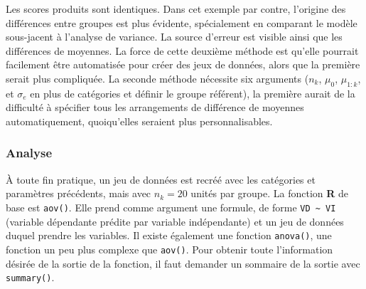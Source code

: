 \documentclass[
]{book}
\begin{document}
Les scores produits sont identiques. Dans cet exemple par contre, l'origine des différences entre groupes est plus évidente, spécialement en comparant le modèle sous-jacent à l'analyse de variance. La source d'erreur est visible ainsi que les différences de moyennes. La force de cette deuxième méthode est qu'elle pourrait facilement être automatisée pour créer des jeux de données, alors que la première serait plus compliquée. La seconde méthode nécessite six arguments (\(n_k\), \(\mu_0\), \(\mu_{1:k}\), et \(\sigma_{e}\) en plus de catégories et définir le groupe référent), la première aurait de la difficulté à spécifier tous les arrangements de différence de moyennes automatiquement, quoiqu'elles seraient plus personnalisables.

\hypertarget{analyse}{%
\subsubsection{Analyse}\label{analyse}}

À toute fin pratique, un jeu de données est recréé avec les catégories et paramètres précédents, mais avec \(n_k=20\) unités par groupe. La fonction \textbf{R} de base est \texttt{aov()}. Elle prend comme argument une formule, de forme \texttt{VD\ \textasciitilde{}\ VI} (variable dépendante prédite par variable indépendante) et un jeu de données duquel prendre les variables. Il existe également une fonction \texttt{anova()}, une fonction un peu plus complexe que \texttt{aov()}. Pour obtenir toute l'information désirée de la sortie de la fonction, il faut demander un sommaire de la sortie avec \texttt{summary()}.
\end{document}
